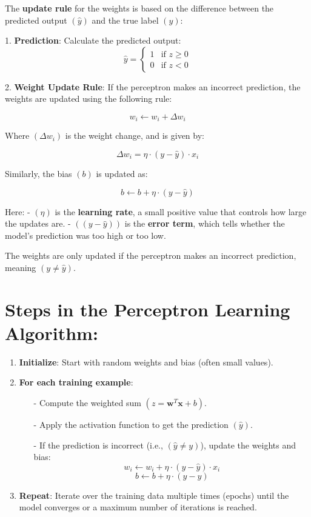 \documentclass[10pt]{article}
\begin{document}
The {\bf update rule} for the weights is based on the difference between the predicted output $( \hat{y} )$ and the true label $( y )$:

1. {\bf Prediction}: Calculate the predicted output:
   $$
   \hat{y} = \begin{cases} 
   1 & \text{if } z \geq 0 \\ 
   0 & \text{if } z < 0 
   \end{cases}
   $$
   
2. {\bf Weight Update Rule}: If the perceptron makes an incorrect prediction, the weights are updated using the following rule:
   
$$
w_i \leftarrow w_i + \Delta w_i
$$
   
Where $( \Delta w_i )$ is the weight change, and is given by:

$$
\Delta w_i = \eta \cdot (y - \hat{y}) \cdot x_i
$$

Similarly, the bias $( b )$ is updated as:

$$
b \leftarrow b + \eta \cdot (y - \hat{y})
$$

Here:
- $( \eta )$ is the {\bf learning rate}, a small positive value that controls how large the updates are.
- $( (y - \hat{y}) )$ is the {\bf error term}, which tells whether the model’s prediction was too high or too low.

The weights are only updated if the perceptron makes an incorrect prediction, meaning $( y \neq \hat{y} )$.

\section{ Steps in the Perceptron Learning Algorithm:}

\begin{enumerate}
   \item {\bf Initialize}: Start with random weights and bias (often small values).
   \item {\bf For each training example}:
      \begin{itemize}
         \item [-] Compute the weighted sum $( z = \mathbf{w}^T \mathbf{x} + b )$.
         \item [-] Apply the activation function to get the prediction $( \hat{y} )$.
         \item [-] If the prediction is incorrect (i.e., $( \hat{y} \neq y )$), update the weights and bias:
           $$
           w_i \leftarrow w_i + \eta \cdot (y - \hat{y}) \cdot x_i
           $$
           $$
           b \leftarrow b + \eta \cdot (y - \hat{y})
           $$
      \end{itemize}
   \item {\bf Repeat}: Iterate over the training data multiple times (epochs) until the model converges or a maximum number of iterations is reached.
\end{enumerate}
\end{document}
